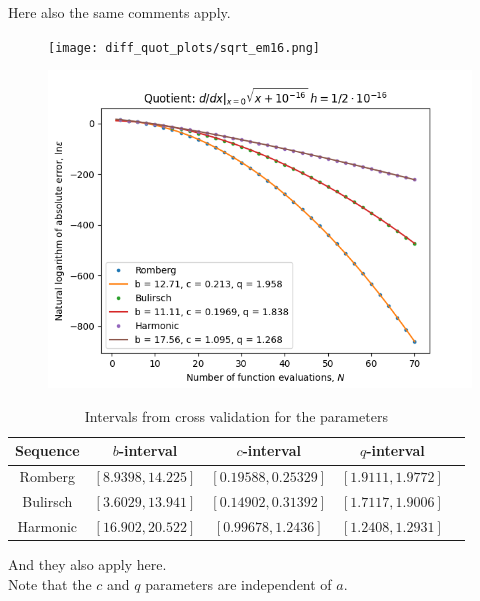 Here also the same comments apply.

\begin{figure}[H]
\centering
\begin{minipage}{0.45\textwidth}
\centering
\texttt{[image: diff\_quot\_plots/sqrt\_em16.png]}
\end{minipage}
\begin{minipage}{0.45\textwidth}
\centering
\includegraphics[scale=0.45]{diff_quot_plots/sqrt_em16_hp_trend.png}
\end{minipage}
\end{figure}

\begin{table}[H]
    \centering
    \begin{tabular}{c|c||c|c|c}
Sequence & \(b\)-interval & \(c\)-interval & \(q\)-interval\\\hline\hline
Romberg &\([8.9398, 14.225]\) & \([0.19588, 0.25329]\) & \([1.9111, 1.9772]\)\\
Bulirsch & \([3.6029, 13.941]\) & \([0.14902, 0.31392]\) & \([1.7117, 1.9006]\)\\
Harmonic & \([16.902, 20.522]\) & \([0.99678, 1.2436]\) & \([1.2408, 1.2931]\)\\
    \end{tabular}
    \caption{Intervals from cross validation for the parameters}
    \label{tab:my_label}
\end{table}

And they also apply here.\\

Note that the \(c\) and \(q\) parameters are independent of \(a\).

